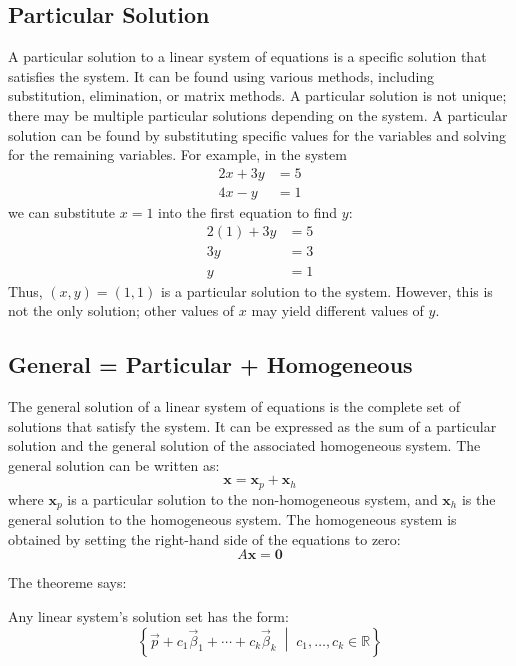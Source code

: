 \subsection{Particular Solution}
A particular solution to a linear system of equations is a specific solution that satisfies the system. It can be found using various methods, including substitution, elimination, or matrix methods. A particular solution is not unique; there may be multiple particular solutions depending on the system.
A particular solution can be found by substituting specific values for the variables and solving for the remaining variables. For example, in the system
\begin{align*}
	2x + 3y & = 5 \\
	4x - y  & = 1
\end{align*}
we can substitute \(x = 1\) into the first equation to find \(y\):
\begin{align*}
	2(1) + 3y & = 5 \\
	3y        & = 3 \\
	y         & = 1
\end{align*}
Thus, \((x, y) = (1, 1)\) is a particular solution to the system. However, this is not the only solution; other values of \(x\) may yield different values of \(y\).

\subsection{General = Particular + Homogeneous}
The general solution of a linear system of equations is the complete set of solutions that satisfy the system. It can be expressed as the sum of a particular solution and the general solution of the associated homogeneous system.
The general solution can be written as:
\begin{equation*}
	\mathbf{x} = \mathbf{x}_p + \mathbf{x}_h
\end{equation*}
where \( \mathbf{x}_p \) is a particular solution to the non-homogeneous system, and \( \mathbf{x}_h \) is the general solution to the homogeneous system.
The homogeneous system is obtained by setting the right-hand side of the equations to zero:
\begin{equation*}
	A \mathbf{x} = \mathbf{0}
\end{equation*}

 The theoreme says:

Any linear system's solution set has the form:
\[
	\left\{ \vec{p} + c_1\vec{\beta}_1 + \cdots + c_k\vec{\beta}_k \;\middle|\; c_1, \ldots, c_k \in \mathbb{R} \right\}
\]

